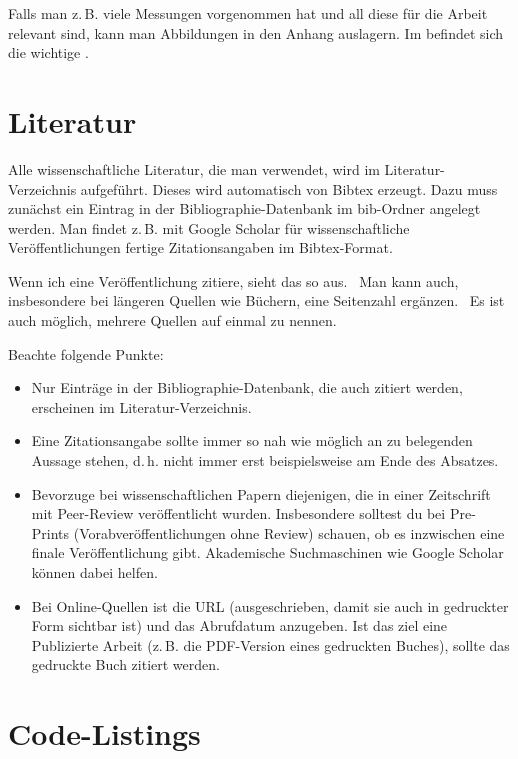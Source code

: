 Falls man z.\,B. viele Messungen vorgenommen hat und all diese für die Arbeit relevant sind, kann man Abbildungen in den Anhang auslagern.
Im  befindet sich die wichtige .

\section{Literatur}
Alle wissenschaftliche Literatur, die man verwendet, wird im Literatur-Verzeichnis aufgeführt.
Dieses wird automatisch von Bibtex erzeugt.
Dazu muss zunächst ein Eintrag in der Bibliographie-Datenbank im bib-Ordner angelegt werden.
Man findet z.\,B. mit Google Scho\-lar für wissenschaftliche Veröffentlichungen fertige Zitationsangaben im Bibtex-Format.

Wenn ich eine Veröffentlichung zitiere, sieht das so aus.~\cite{Krauthoff2017a}
Man kann auch, insbesondere bei längeren Quellen wie Büchern, eine Seitenzahl ergänzen.~\cite[S.~5]{Krauthoff2017a}
Es ist auch möglich, mehrere Quellen auf einmal zu nennen.\cite{Krauthoff2017a,dun:j:argument-acceptability}

Beachte folgende Punkte:
\begin{itemize}
    \item Nur Einträge in der Bibliographie-Datenbank, die auch zitiert werden, erscheinen im Literatur-Verzeichnis.
    \item Eine Zitationsangabe sollte immer so nah wie möglich an zu belegenden Aussage stehen, d.\,h. nicht immer erst beispielsweise am Ende des Absatzes.
    \item Bevorzuge bei wissenschaftlichen Papern diejenigen, die in einer Zeitschrift mit Peer-Review veröffentlicht wurden. Insbesondere solltest du bei Pre-Prints (Vorabveröffentlichungen ohne Review) schauen, ob es inzwischen eine finale Veröffentlichung gibt. Akademische Suchmaschinen wie Google Scholar können dabei helfen.
    \item Bei Online-Quellen \cite{jvmspec} ist die URL (ausgeschrieben, damit sie auch in gedruckter Form sichtbar ist) und das Abrufdatum anzugeben. Ist das ziel eine Publizierte Arbeit (z.\,B. die PDF-Version eines gedruckten Buches), sollte das gedruckte Buch zitiert werden.
\end{itemize}

\section{Code-Listings}

